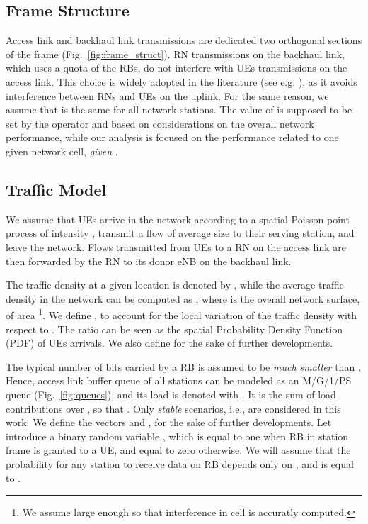 \documentclass[draftcls,onecolumn]{IEEEtran}
\theoremstyle{plain}
\theoremstyle{definition}
\begin{document}
\subsection{Frame Structure}
Access link and backhaul link transmissions are dedicated two orthogonal sections of the frame (Fig.~\ref{fig:frame_struct}). RN transmissions on the backhaul link, which uses a quota  of the RBs, do not interfere with UEs transmissions on the access link.
This choice is widely adopted in the literature (see e.g. \cite{bulakci13, Liang11}), as it avoids interference between RNs and UEs on the uplink. For the same reason, we assume that  is the same for all network stations. The value of  is supposed to be set by the operator and based on considerations on the overall network performance, while our analysis is focused on the performance related to one given network cell, {\it given} . 

\subsection{Traffic Model}
We assume that UEs arrive in the network according to a spatial Poisson point process of intensity , transmit a flow of average size  to their serving station, and leave the network. 
Flows transmitted from UEs to a RN on the access link are then forwarded by the RN to its donor eNB on the backhaul link. 


The traffic density  at a given location  is denoted by , while the average traffic density  in the network can be computed as  , where  is the overall network surface, of area \footnote{We assume  large enough so that interference in cell  is accuratly computed.}. We define , to account for the local variation of the traffic density with respect to . 
The ratio  can be seen as the spatial Probability Density Function (PDF) of UEs arrivals. We also define  for the sake of further developments.

The typical number of bits carried by a RB is assumed to be {\it much smaller} than . Hence, access link buffer queue of all stations  can be modeled as an M/G/1/PS queue (Fig.~\ref{fig:queues}), and its load is denoted with . It is the sum of load contributions  over , so that 
. Only {\it stable} scenarios, i.e.,  are considered in this work. We define the vectors  and , for the sake of further developments. 
Let introduce a binary random variable , which is equal to one when RB  in station  frame is granted to a UE, and equal to zero otherwise. 
We will assume that the probability for any station  to receive data on RB  depends only on , and is equal to .
\end{document}
